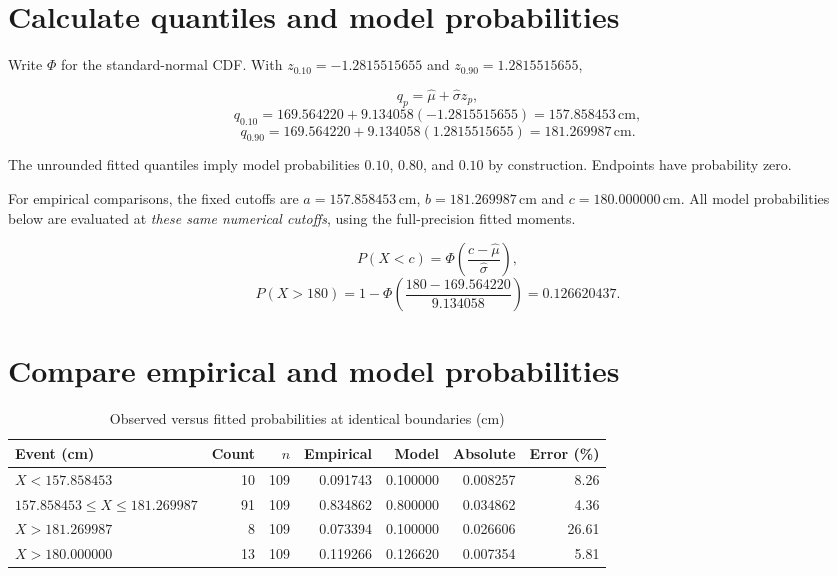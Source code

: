 \documentclass[10pt,a4paper]{article}
\newcommand{\cm}{\,\mathrm{cm}}
\begin{document}
\section{Calculate quantiles and model probabilities}
Write $\Phi$ for the standard-normal CDF. With
	$z_{0.10}=-1.2815515655$ and $z_{0.90}=1.2815515655$,
	
	\[
	q_p=\widehat\mu+\widehat\sigma z_p,
	\]
	\[
	q_{0.10}
	=169.564220+9.134058(-1.2815515655)
	=157.858453\cm,
	\]
	\[
	q_{0.90}
	=169.564220+9.134058(1.2815515655)
	=181.269987\cm.
	\]
	
	The unrounded fitted quantiles imply model probabilities
	$0.10$, $0.80$, and $0.10$ by construction. Endpoints
	have probability zero.
	
	For empirical comparisons, the fixed cutoffs are
	$a=157.858453\cm$, $b=181.269987\cm$ and
	$c=180.000000\cm$. All model probabilities below are
	evaluated at \emph{these same numerical cutoffs}, using
	the full-precision fitted moments.
	
	\[
	P(X<c)=\Phi\!\left(
	\frac{c-\widehat\mu}{\widehat\sigma}
	\right),
	\]
	\[
	P(X>180)
	=1-\Phi\!\left(
	\frac{180-169.564220}{9.134058}
	\right)
	=0.126620437.
	\]

\section{Compare empirical and model probabilities}
\begin{table}[htbp]
		\centering\footnotesize
		\caption{Observed versus fitted probabilities at identical
			boundaries (cm)}
		\label{tab:prob}
		\setlength{\tabcolsep}{3pt}
		\begin{tabularx}{\linewidth}{
				@{}>{\raggedright\arraybackslash}Xrrrrrr@{}}
			\toprule
			Event (cm) & Count & $n$ & Empirical & Model &
			Absolute & Error (\%) \\
			\midrule
			$X<157.858453$ &
			10 & 109 & 0.091743 & 0.100000 & 0.008257 & 8.26 \\
			$157.858453\le X\le181.269987$ &
			91 & 109 & 0.834862 & 0.800000 & 0.034862 & 4.36 \\
			$X>181.269987$ &
			8 & 109 & 0.073394 & 0.100000 & 0.026606 & 26.61 \\
			$X>180.000000$ &
			13 & 109 & 0.119266 & 0.126620 & 0.007354 & 5.81 \\
			\bottomrule
		\end{tabularx}
	\end{table}
	
\end{document}

